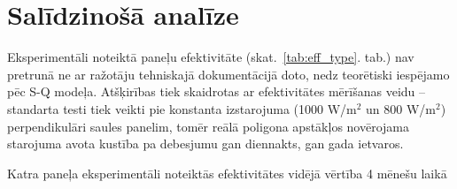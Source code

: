 \section{Salīdzinošā analīze}\label{section:effectivity}

Eksperimentāli noteiktā paneļu efektivitāte (skat.~\ref{tab:eff_type}. tab.) nav pretrunā ne ar ražotāju tehniskajā dokumentācijā doto, nedz teorētiski iespējamo pēc S-Q modeļa. 
Atšķirības tiek skaidrotas ar efektivitātes mērīšanas veidu -- standarta testi tiek veikti pie konstanta izstarojuma (1000 W/m$^2$ un 800 W/m$^2$) perpendikulāri saules panelim, tomēr reālā poligona apstākļos novērojama starojuma avota kustība pa debesjumu gan diennakts, gan gada ietvaros.

\begin{table}[h!]
    \caption{Katra paneļa eksperimentāli noteiktās efektivitātes vidējā vērtība 4 mēnešu laikā}
    \begin{center}
    
    \end{center}
    \label{tab:eff_type}
\end{table}

